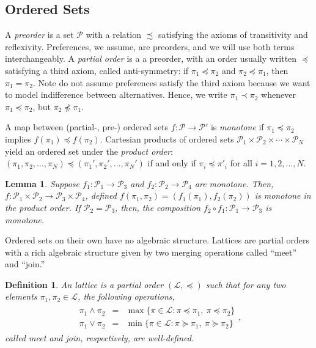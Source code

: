 \documentclass[conference]{ieeeconf}
\renewcommand{\P}{\mathcal{P}}
\renewcommand{\L}{\mathcal{L}}
\newcommand{\join}{\vee}
\newcommand{\meet}{\wedge}
\newtheorem{lemma}{Lemma}
\newtheorem{definition}{Definition}
\begin{document}
\subsection{Ordered Sets}

A \emph{preorder} is a set $\P$ with a relation $\precsim$ satisfying the axioms of transitivity and reflexivity. Preferences, we assume, are preorders, and we will use both terms interchangeably. A \emph{partial order} is a a preorder, with an order usually written $\preceq$ satisfying a third axiom, called anti-symmetry: if $\pi_1 \preceq \pi_2$ and $\pi_2 \preceq \pi_1$, then $\pi_1 = \pi_2$. Note do not assume preferences satisfy the third axiom because we want to model indifference between alternatives. Hence, we write $\pi_1 \prec \pi_2$ whenever $\pi_1 \preceq \pi_2$, but $\pi_2 \not \preceq \pi_1$.

A map between (partial-, pre-) ordered sets $f: \P \to \P'$ is \emph{monotone} if $\pi_1 \preceq \pi_2$ implies $f(\pi_1) \preceq f(\pi_2)$. Cartesian products of ordered sets $\P_1 \times \P_2 \times \cdots \times \P_N$ yield an ordered set under the \emph{product order}: $(\pi_1, \pi_2, \dots, \pi_N) \preceq (\pi_1', \pi_2', \dots, \pi_N')$ if and only if $\pi_i \preceq \pi'_i$ for all $i = 1,2,\dots, N$.

\begin{lemma} \label{lem:compose-produt}
    Suppose $f_1: \P_1 \to \P_3$ and $f_2: \P_2 \to \P_4$ are monotone.  Then, $f: \P_1 \times \P_2 \to \P_3 \times \P_4$, defined $f(\pi_1,\pi_2) = (f_1(\pi_1),f_2(\pi_2))$ is monotone in the product order. If $\P_2 = \P_3$, then, the composition $f_2 \circ f_1: \P_1 \to \P_3$ is monotone.
\end{lemma}

Ordered sets on their own have no algebraic structure. Lattices are partial orders with a rich algebraic structure given by two merging operations called ``meet'' and ``join.''
 
\begin{definition} \label{def:lattice}
    An \emph{lattice} is a partial order $(\L, \preceq)$ such that for any two elements $\pi_1, \pi_2 \in \L$, the following operations,
    \begin{align*}
        \begin{aligned}
        \pi_1 \meet \pi_2 &=& \max\{ \pi \in \L: \pi \preceq \pi_1,~\pi \preceq \pi_2 \} \\
        \pi_1 \join \pi_2 &=& \min\{ \pi \in \L: \pi \succeq \pi_1,~\pi \succeq \pi_2 \}        
        \end{aligned},
    \end{align*}
    called \emph{meet} and \emph{join}, respectively, are well-defined. 
\end{definition}
\end{document}
